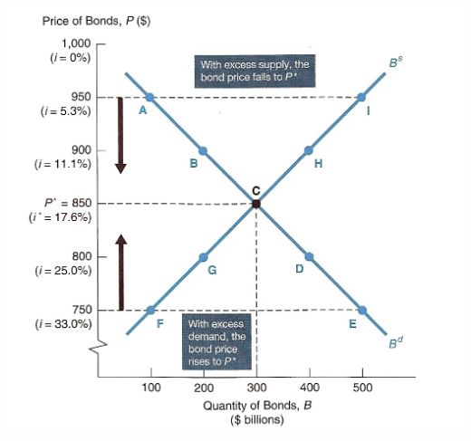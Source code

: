 \documentclass[12pt]{examnotes}
\begin{document}
\includegraphics[scale=0.3]{./imgs/51.jpg}
\end{document}
